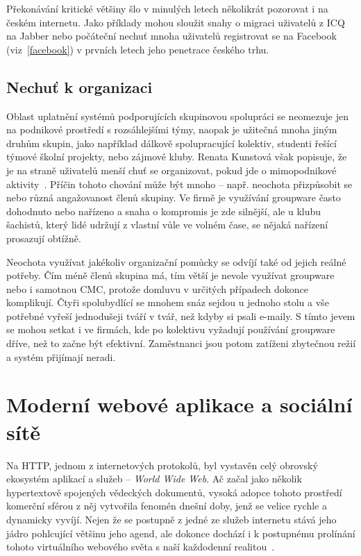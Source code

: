 \documentclass[12pt,oneside,final]{fithesis2}
\begin{document}
Překonávání kritické většiny šlo v minulých letech několikrát pozorovat i na českém internetu. Jako příklady mohou sloužit snahy o migraci uživatelů z ICQ na Jabber nebo počáteční nechuť mnoha uživatelů registrovat se na Facebook (viz~\ref{facebook}) v prvních letech jeho penetrace českého trhu.

\subsection{Nechuť k organizaci}\label{noOrganization}
Oblast uplatnění systémů podporujících skupinovou spolupráci se neomezuje jen na podnikové prostředí s rozsáhlejšími týmy, naopak je užitečná mnoha jiným druhům skupin, jako například dálkově spolupracující kolektiv, studenti řešící týmové školní projekty, nebo zájmové kluby. Renata Kunstová však popisuje, že je na straně uživatelů menší chuť se organizovat, pokud jde o mimopodnikové aktivity~\cite{kunstova1999skupinova}. Příčin tohoto chování může být mnoho -- např. neochota přizpůsobit se nebo různá angažovanost členů skupiny. Ve firmě je využívání groupware často dohodnuto nebo nařízeno a snaha o kompromis je zde silnější, ale u klubu šachistů, který lidé udržují z vlastní vůle ve volném čase, se nějaká nařízení prosazují obtížně.

Neochota využívat jakékoliv organizační pomůcky se odvíjí také od jejich reálné potřeby. Čím méně členů skupina má, tím větší je nevole využívat groupware nebo i samotnou CMC, protože domluvu v určitých případech dokonce komplikují. Čtyři spolubydlící se mnohem snáz sejdou u jednoho stolu a vše potřebné vyřeší jednodušeji tváří v tvář, než kdyby si psali e-maily. S tímto jevem se mohou setkat i ve firmách, kde po kolektivu vyžadují používání groupware dříve, než to začne být efektivní. Zaměstnanci jsou potom zatíženi zbytečnou režií a systém přijímají neradi.


\section{Moderní webové aplikace a sociální sítě}\label{web}
Na HTTP, jednom z internetových protokolů, byl vystavěn celý obrovský ekosystém aplikací a služeb -- \emph{World Wide Web}. Ač začal jako několik hypertextově spojených vědeckých dokumentů, vysoká adopce tohoto prostředí komerční sférou z něj vytvořila fenomén dnešní doby, jenž se velice rychle a dynamicky vyvíjí. Nejen že se postupně z jedné ze služeb internetu stává jeho jádro pohlcující většinu jeho agend, ale dokonce dochází i k postupnému prolínání tohoto virtuálního webového světa s naší každodenní realitou~\cite{thurlow2004computer}.
\end{document}
